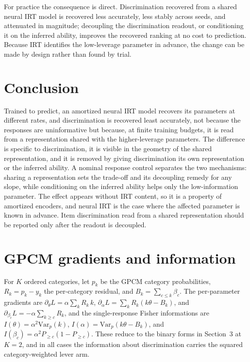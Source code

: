 \documentclass[twocolumn,10pt]{article}
\begin{document}
For practice the consequence is direct. Discrimination recovered from a shared neural IRT
model is recovered less accurately, less stably across seeds, and attenuated in magnitude;
decoupling the discrimination readout, or conditioning it on the inferred ability, improves
the recovered ranking at no cost to prediction. Because IRT identifies the low-leverage
parameter in advance, the change can be made by design rather than found by trial.

\section{Conclusion}
Trained to predict, an amortized neural IRT model recovers its parameters at different
rates, and discrimination is recovered least accurately, not because the responses are uninformative
but because, at finite training budgets, it is read from a representation shared with the
higher-leverage parameters. The difference is specific to discrimination, it is visible in
the geometry of the shared representation, and it is removed by giving discrimination its
own representation or the inferred ability. A nominal response control separates the two
mechanisms: sharing a representation sets the trade-off and its decoupling remedy for any
slope, while conditioning on the inferred ability helps only the low-information parameter.
The effect appears without IRT content, so it is a property of amortized encoders, and neural
IRT is the case where the affected parameter is known in advance. Item discrimination read
from a shared representation should be reported only after the readout is decoupled.

\appendix
\section{GPCM gradients and information}
For $K$ ordered categories, let $p_k$ be the GPCM category probabilities, $R_k=p_k-y_k$ the
per-category residual, and $B_k=\sum_{c\le k}\beta_c$. The per-parameter gradients are
$\partial_\theta L=\alpha\sum_k R_k\,k$, $\partial_\alpha L=\sum_k R_k(k\theta-B_k)$, and
$\partial_{\beta_c}L=-\alpha\sum_{k\ge c}R_k$, and the single-response Fisher informations
are $I(\theta)=\alpha^2\mathrm{Var}_p(k)$, $I(\alpha)=\mathrm{Var}_p(k\theta-B_k)$, and
$I(\beta_c)=\alpha^2 P_{\ge c}(1-P_{\ge c})$. These reduce to the binary forms in Section~3
at $K=2$, and in all cases the information about discrimination carries the squared
category-weighted lever arm.
\end{document}
